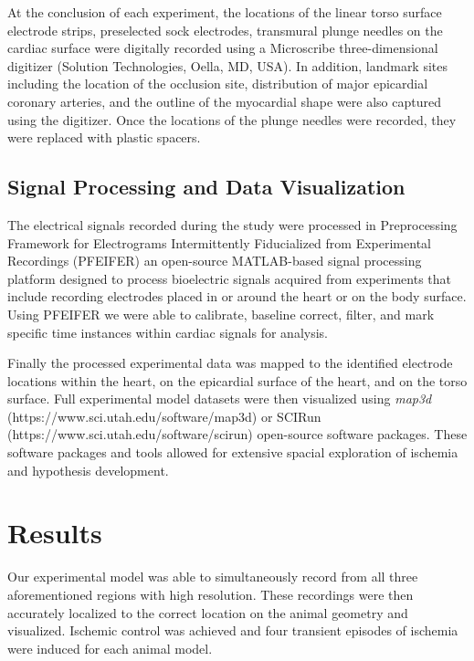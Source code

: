 \documentclass[twocolumn]{cinc}
\newcommand{\mapthreed}{\textit{map3d }}
\begin{document}

At the conclusion of each experiment, the locations of the linear torso surface electrode strips, preselected sock electrodes, transmural plunge needles on the cardiac surface were digitally recorded using a Microscribe three-dimensional digitizer (Solution Technologies, Oella, MD, USA). In addition, landmark sites including the location of the occlusion site, distribution of major epicardial coronary arteries, and the outline of the myocardial shape were also captured using the digitizer. Once the locations of the plunge needles were recorded, they were replaced with plastic spacers. 


\subsection{Signal Processing and Data Visualization}

The electrical signals recorded during the study were processed in Preprocessing Framework for Electrograms Intermittently Fiducialized from Experimental Recordings (PFEIFER) an open-source MATLAB-based signal processing platform designed to process bioelectric signals acquired from experiments that include recording electrodes placed in or around the heart or on the body surface. \cite{Rodenhauser2018} Using PFEIFER we were able to calibrate, baseline correct, filter, and mark specific time instances within cardiac signals for analysis.

Finally the processed experimental data was mapped to the identified electrode locations within the heart, on the epicardial surface of the heart, and on the torso surface. Full experimental model datasets were then visualized using \mapthreed (https://www.sci.utah.edu/software/map3d) or SCIRun (https://www.sci.utah.edu/software/scirun) open-source software packages. These software packages and tools allowed for extensive spacial exploration of ischemia and hypothesis development. 

\section{Results}

Our experimental model was able to simultaneously record from all three aforementioned regions with high resolution. These recordings were then accurately localized to the correct location on the animal geometry and visualized. Ischemic control was achieved and four transient episodes of ischemia were induced for each animal model.  
\end{document}
